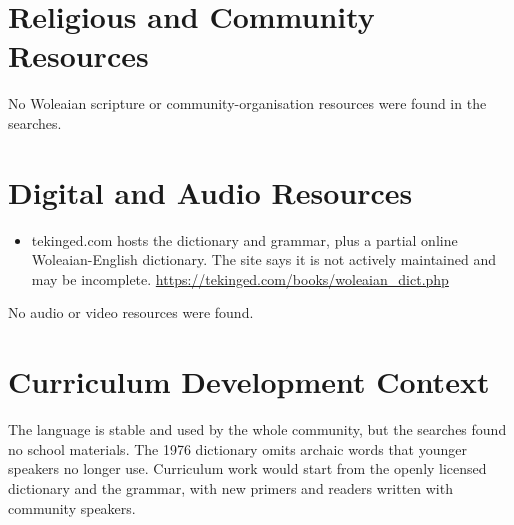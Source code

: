 \documentclass[12pt]{article}
\begin{document}
\section{Religious and Community Resources}
No Woleaian scripture or community-organisation resources were found in the searches.

\section{Digital and Audio Resources}
\begin{itemize}
\item tekinged.com hosts the dictionary and grammar, plus a partial online Woleaian-English dictionary. The site says it is not actively maintained and may be incomplete. \url{https://tekinged.com/books/woleaian_dict.php}
\end{itemize}
No audio or video resources were found.

\section{Curriculum Development Context}
The language is stable and used by the whole community, but the searches found no school materials. The 1976 dictionary omits archaic words that younger speakers no longer use. Curriculum work would start from the openly licensed dictionary and the grammar, with new primers and readers written with community speakers.
\end{document}
